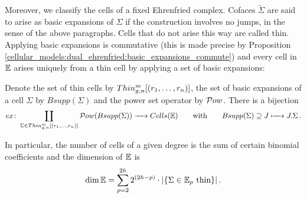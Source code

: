 Moreover, we classify the cells of a fixed Ehrenfried complex.
Cofaces $\tilde\Sigma$ are said to arise as basic expansions of $\Sigma$ if the construction involves no jumps, in the sense of the above paragraphs.
Cells that do not arise this way are called thin.
Applying basic expansions is commutative (this is made precise by Proposition \ref{cellular_models:dual_ehrenfried:basic_expansions_commute})
and every cell in $\mathbb E$ arises uniquely from a thin cell by applying a set of basic expansions:
\begin{prop*}[\ref{cellular_models:dual_ehrenfried:every_cell_is_an_expansion}]
    Denote the set of thin cells by $\Thin$, the set of basic expansions of a cell $\Sigma$ by $Bsupp(\Sigma)$ and the power set operator by $\mathcal{P}ow$.
    There is a bijection
    \[
        ex \colon \coprod_{\Sigma \in \Thin} \mc Pow( Bsupp(\Sigma)) \to Cells(\E) \mspc{with}{20} Bsupp(\Sigma) \supseteq J \mapsto J.\Sigma \,.
    \]
\end{prop*}
In particular, the number of cells of a given degree is the sum of certain binomial coefficients and the dimension of $\mathbb E$ is
\[
    \dim \mathbb E = \sum_{p=2}^{2h} 2^{(2h-p)} \cdot |\{\Sigma \in \mathbb E_p \text{ thin} \}| \,.
\]



